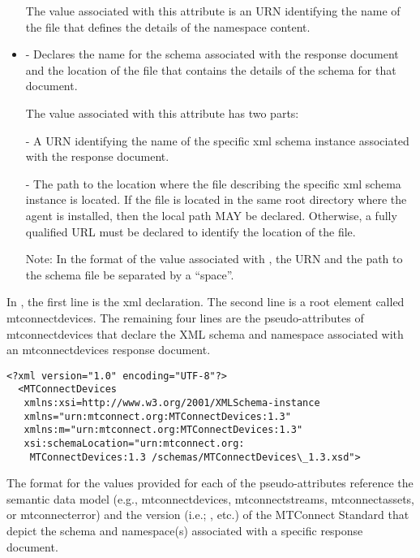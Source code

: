 \begin{itemize}
The value associated with this attribute is an URN identifying the name of the file that defines the details of the \gls{namespace} content.

\item {} -  Declares the name for the \gls{schema} associated with the \gls{response document} and the location of the file that contains the details of the \gls{schema} for that document.

The value associated with this attribute has two parts:

\tab - A URN identifying the name of the specific \gls{xml schema} instance associated with the \gls{response document}.

\tab - The path to the location where the file describing the specific \gls{xml schema} instance is located.  If the file is located in the same root directory where the \gls{agent} is installed, then the local path MAY be declared.  Otherwise, a fully qualified URL must be declared to identify the location of the file.

\begin{note}
Note:	In the format of the value associated with , the URN and the path to the \gls{schema} file \MUST be separated by a “space”.
\end{note}

\end{itemize}

In , the first line is the \gls{xml declaration}.  The second line is a \gls{root element} called \gls{mtconnectdevices}.  The remaining four lines are the pseudo-attributes of \gls{mtconnectdevices} that declare the XML \gls{schema} and \gls{namespace} associated with an \gls{mtconnectdevices response document}.

\begin{lstlisting}[firstnumber=1,escapechar=|,%
    caption={Example of schema and namespace declaration}, label={lst:schema-and-namespace-declaration}]
<?xml version="1.0" encoding="UTF-8"?>
  <MTConnectDevices
   xmlns:xsi=http://www.w3.org/2001/XMLSchema-instance
   xmlns="urn:mtconnect.org:MTConnectDevices:1.3"
   xmlns:m="urn:mtconnect.org:MTConnectDevices:1.3"
   xsi:schemaLocation="urn:mtconnect.org:
    MTConnectDevices:1.3 /schemas/MTConnectDevices\_1.3.xsd">
\end{lstlisting}

The format for the values provided for each of the pseudo-attributes \MUST reference the \gls{semantic data model} (e.g., \gls{mtconnectdevices}, \gls{mtconnectstreams}, \gls{mtconnectassets}, or \gls{mtconnecterror}) and the version (i.e.; , etc.) of the MTConnect Standard that depict the \gls{schema} and \gls{namespace}(s) associated with a specific \gls{response document}.

